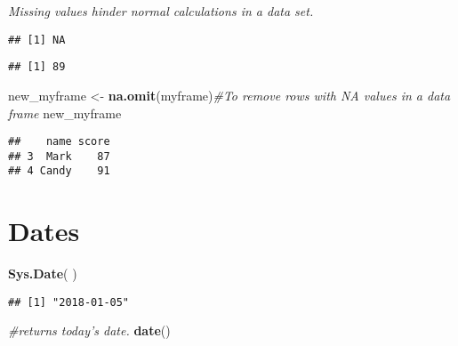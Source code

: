 \documentclass[]{book}
\newenvironment{Shaded}{\begin{snugshade}}{\end{snugshade}}
\newcommand{\KeywordTok}[1]{\textcolor[rgb]{0.13,0.29,0.53}{\textbf{#1}}}
\newcommand{\DataTypeTok}[1]{\textcolor[rgb]{0.13,0.29,0.53}{#1}}
\newcommand{\StringTok}[1]{\textcolor[rgb]{0.31,0.60,0.02}{#1}}
\newcommand{\CommentTok}[1]{\textcolor[rgb]{0.56,0.35,0.01}{\textit{#1}}}
\newcommand{\OperatorTok}[1]{\textcolor[rgb]{0.81,0.36,0.00}{\textbf{#1}}}
\newcommand{\NormalTok}[1]{#1}
\theoremstyle{definition}
\theoremstyle{definition}
\theoremstyle{definition}
\theoremstyle{remark}
\begin{document}
\emph{Missing values hinder normal calculations in a data set. }

\begin{Shaded}
\end{Shaded}

\begin{verbatim}
## [1] NA
\end{verbatim}

\begin{Shaded}
\end{Shaded}

\begin{verbatim}
## [1] 89
\end{verbatim}

\begin{Shaded}
\begin{Highlighting}[]
\NormalTok{new_myframe <-}\StringTok{ }\KeywordTok{na.omit}\NormalTok{(myframe)}\CommentTok{#To remove rows with NA values in a data frame}
\NormalTok{new_myframe}
\end{Highlighting}
\end{Shaded}

\begin{verbatim}
##    name score
## 3  Mark    87
## 4 Candy    91
\end{verbatim}

\section{Dates}\label{dates}

\begin{Shaded}
\begin{Highlighting}[]
\KeywordTok{Sys.Date}\NormalTok{( ) }
\end{Highlighting}
\end{Shaded}

\begin{verbatim}
## [1] "2018-01-05"
\end{verbatim}

\begin{Shaded}
\begin{Highlighting}[]
\CommentTok{#returns today's date. }
\KeywordTok{date}\NormalTok{() }
\end{Highlighting}
\end{Shaded}
\end{document}
